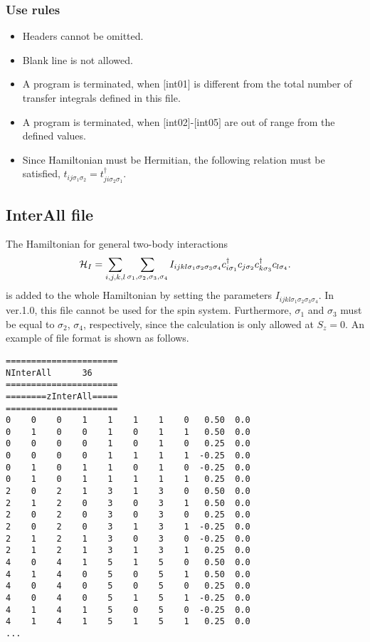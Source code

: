 \subsubsection{Use rules}
\begin{itemize}
\item Headers cannot be omitted. 
\item Blank line is not allowed.
\item A program is terminated, when $[$int01$]$ is different from the total number of transfer integrals defined in this file.
\item A program is terminated, when $[$int02$]$-$[$int05$]$ are out of range from the defined values.
\item Since Hamiltonian must be Hermitian, the following relation must be satisfied, $t_{ij\sigma_1\sigma_2}=t_{ji\sigma_2\sigma_1}^{\dagger}$. 
\end{itemize}

\newpage
\subsection{InterAll file}
\label{Subsec:interall}
The Hamiltonian for general two-body interactions 
\begin{align}
{\cal H}_I =\sum_{i,j,k,l}\sum_{\sigma_1,\sigma_2, \sigma_3, \sigma_4}
I_{ijkl\sigma_1\sigma_2\sigma_3\sigma_4}c_{i\sigma_1}^{\dagger}c_{j\sigma_2}c_{k\sigma_3}^{\dagger}c_{l\sigma_4}.
\end{align}
is added to the whole Hamiltonian by setting the parameters $I_{ijkl\sigma_1\sigma_2\sigma_3\sigma_4}$. 
In ver.1.0, this file cannot be used for the spin system. Furthermore, $\sigma_1$ and $\sigma_3$ must be equal to $\sigma_2$, $\sigma_4$, respectively, since the calculation is only allowed at $S_z=0$. 
An example of file format is shown as follows.

\begin{minipage}{12.5cm}
\begin{screen}
\begin{verbatim}
====================== 
NInterAll      36  
====================== 
========zInterAll===== 
====================== 
0    0    0    1    1    1    1    0   0.50  0.0
0    1    0    0    1    0    1    1   0.50  0.0
0    0    0    0    1    0    1    0   0.25  0.0
0    0    0    0    1    1    1    1  -0.25  0.0
0    1    0    1    1    0    1    0  -0.25  0.0
0    1    0    1    1    1    1    1   0.25  0.0
2    0    2    1    3    1    3    0   0.50  0.0
2    1    2    0    3    0    3    1   0.50  0.0
2    0    2    0    3    0    3    0   0.25  0.0
2    0    2    0    3    1    3    1  -0.25  0.0
2    1    2    1    3    0    3    0  -0.25  0.0
2    1    2    1    3    1    3    1   0.25  0.0
4    0    4    1    5    1    5    0   0.50  0.0
4    1    4    0    5    0    5    1   0.50  0.0
4    0    4    0    5    0    5    0   0.25  0.0
4    0    4    0    5    1    5    1  -0.25  0.0
4    1    4    1    5    0    5    0  -0.25  0.0
4    1    4    1    5    1    5    1   0.25  0.0
...
\end{verbatim}
\end{screen}
\end{minipage}

